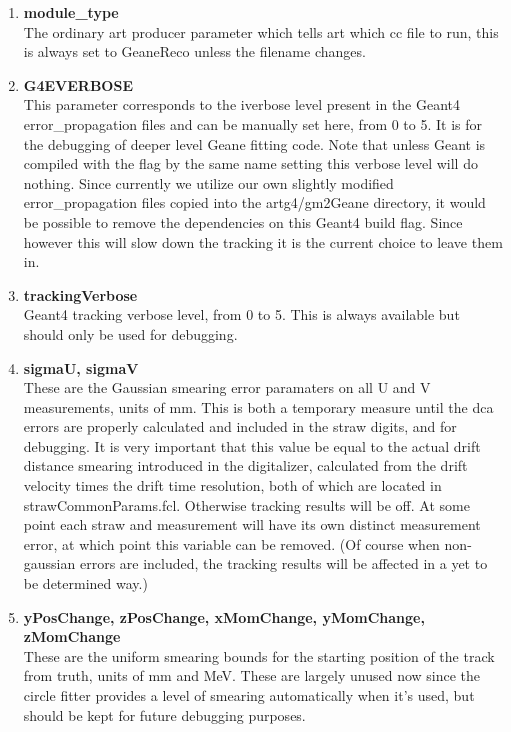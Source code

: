 \documentclass{article}
\begin{document}
    \begin{enumerate}

      \item{\bf{module\_type}} \\
      The ordinary art producer parameter which tells art which cc file to run, this is always set to GeaneReco unless the filename changes.

      \item{\bf{G4EVERBOSE}} \\
      This parameter corresponds to the iverbose level present in the Geant4 error\_propagation files and can be manually set here, from 0 to 5. It is for the debugging of deeper level Geane fitting code. Note that unless Geant is compiled with the flag by the same name setting this verbose level will do nothing. Since currently we utilize our own slightly modified error\_propagation files copied into the artg4/gm2Geane directory, it would be possible to remove the dependencies on this Geant4 build flag. Since however this will slow down the tracking it is the current choice to leave them in. 

      \item{\bf{trackingVerbose}} \\
      Geant4 tracking verbose level, from 0 to 5. This is always available but should only be used for debugging.

      \item{\bf{sigmaU, sigmaV}} \\
      These are the Gaussian smearing error paramaters on all U and V measurements, units of mm. This is both a temporary measure until the dca errors are properly calculated and included in the straw digits, and for debugging. It is very important that this value be equal to the actual drift distance smearing introduced in the digitalizer, calculated from the drift velocity times the drift time resolution, both of which are located in strawCommonParams.fcl. Otherwise tracking results will be off. At some point each straw and measurement will have its own distinct measurement error, at which point this variable can be removed. (Of course when non-gaussian errors are included, the tracking results will be affected in a yet to be determined way.)

      \item{\bf{yPosChange, zPosChange, xMomChange, yMomChange, zMomChange}} \\
      These are the uniform smearing bounds for the starting position of the track from truth, units of mm and MeV. These are largely unused now since the circle fitter provides a level of smearing automatically when it's used, but should be kept for future debugging purposes.


\end{enumerate}
\end{document}
